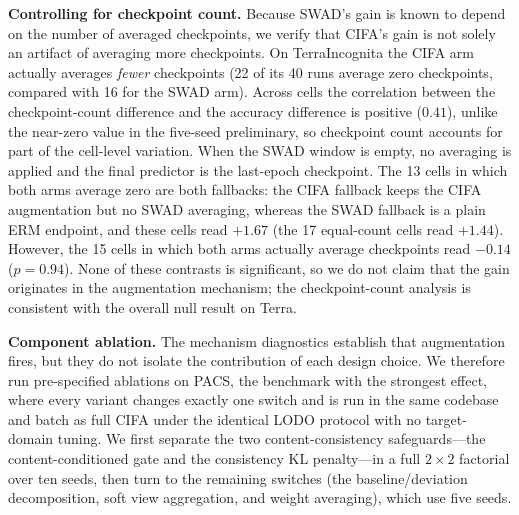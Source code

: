 \documentclass[electronics,article,submit,moreauthors]{Definitions/mdpi}
\begin{document}
\textbf{Controlling for checkpoint count.} Because SWAD's gain is known to depend on the number of averaged checkpoints, we verify that CIFA's gain is not solely an artifact of averaging more checkpoints. On TerraIncognita the CIFA arm actually averages \emph{fewer} checkpoints (22 of its 40 runs average zero checkpoints, compared with 16 for the SWAD arm). Across cells the correlation between the checkpoint-count difference and the accuracy difference is positive ($0.41$), unlike the near-zero value in the five-seed preliminary, so checkpoint count accounts for part of the cell-level variation. When the SWAD window is empty, no averaging is applied and the final predictor is the last-epoch checkpoint. The 13 cells in which both arms average zero are both fallbacks: the CIFA fallback keeps the CIFA augmentation but no SWAD averaging, whereas the SWAD fallback is a plain ERM endpoint, and these cells read $+1.67$ (the 17 equal-count cells read $+1.44$). However, the 15 cells in which both arms actually average checkpoints read $-0.14$ ($p=0.94$). None of these contrasts is significant, so we do not claim that the gain originates in the augmentation mechanism; the checkpoint-count analysis is consistent with the overall null result on Terra.

\textbf{Component ablation.} The mechanism diagnostics establish that augmentation fires, but they do not isolate the contribution of each design choice. We therefore run pre-specified ablations on PACS, the benchmark with the strongest effect, where every variant changes exactly one switch and is run in the same codebase and batch as full CIFA under the identical LODO protocol with no target-domain tuning. We first separate the two content-consistency safeguards---the content-conditioned gate and the consistency KL penalty---in a full $2\times2$ factorial over ten seeds, then turn to the remaining switches (the baseline/deviation decomposition, soft view aggregation, and weight averaging), which use five seeds.
\end{document}
